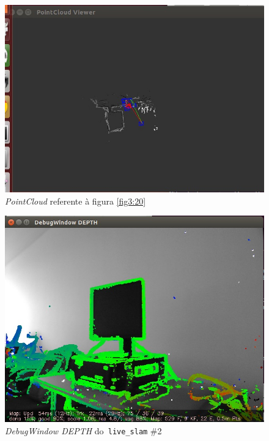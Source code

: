 \begin{figure}[H]
	\centering
		\includegraphics[width= \textwidth]{Imagens/figura3-21.jpg}
	\caption{\textit{PointCloud} referente à figura \ref{fig3:20}}
	\label{fig3:21}
\end{figure}

\begin{figure}[H]
	\centering
		\includegraphics[width= \textwidth]{Imagens/figura3-22.jpg}
	\caption{\textit{DebugWindow DEPTH} do\texttt{ live\_slam} \#2}
	\label{fig3:22}
\end{figure}

